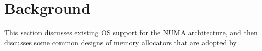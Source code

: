 \section{Background}
\label{sec:overview}

This section discusses existing OS support for the NUMA architecture, and then discusses some common designs of memory allocators that are adopted by \NM{}.  

\begin{comment}

\todo{Cutting half for this section}

\subsection{NUMA Architecture}

\label{sec:numa}

Traditional computers are using the Uniform Memory Access (UMA) model that all CPU cores are sharing a single memory controller, where any core can access the memory with the same latency (uniformly). However, the UMA architecture cannot accommodate the hardware trend with the increasing number of cores, since all of them may compete for the same memory controller. Therefore, the performance bottleneck is the memory controller in many-core machines, since a task cannot proceed without getting its necessary data from the memory. 

The Non-Uniform Memory Access (NUMA) architecture is proposed to solve the scalability issue, due to its decentralized nature. Instead of making all cores waiting for the same memory controller, the NUMA architecture typically is installed with multiple memory controllers, where a group of CPU cores has its memory controller (called as a node). Due to multiple memory controllers, the contention for the memory controller could be largely reduced and therefore the scalability could be improved correspondingly. However, the NUMA architecture also has multiple sources of performance degradations~\cite{Blagodurov:2011:CNC:2002181.2002182}, including \textit{Cache Contention}, \textit{Node Imbalance}, \textit{Interconnect Congestion}, and \textit{Remote Accesses}. 

\paragraph{Cache Contention:} the NUMA architecture is prone to cache contention that multiple tasks may compete for the shared cache. Cache contention will introduce more serious performance issue if the data has to be loaded from a remote node. 
 

\end{comment}
